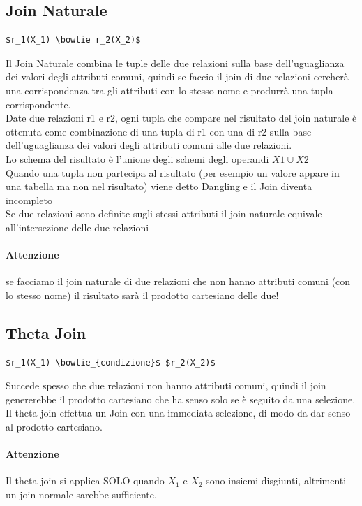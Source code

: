 \documentclass[12pt, a4paper, openany]{book}
\begin{document}
\subsection{Join Naturale}
\begin{lstlisting}[mathescape=true]
$r_1(X_1) \bowtie r_2(X_2)$
\end{lstlisting}
Il Join Naturale combina le tuple delle due relazioni sulla base dell'uguaglianza dei valori degli attributi comuni, quindi se faccio il join di due relazioni cercherà una corrispondenza tra gli attributi con lo stesso nome e produrrà una tupla corrispondente.
\\Date due relazioni r1 e r2, ogni tupla che compare nel risultato del join naturale è ottenuta come combinazione di una tupla di r1 con una di r2 sulla base dell'uguaglianza dei valori degli attributi comuni alle due relazioni.\\
Lo schema del risultato è l'unione degli schemi degli operandi $X1 \cup X2$
\\Quando una tupla non partecipa al risultato (per esempio un valore appare in una tabella ma non nel risultato) viene detto Dangling e il Join diventa incompleto
\\Se due relazioni sono definite sugli stessi attributi il join naturale equivale all'intersezione delle due relazioni
\paragraph{Attenzione} se facciamo il join naturale di due relazioni che non hanno attributi comuni (con lo stesso nome) il risultato sarà il prodotto cartesiano delle due! 

\subsection{Theta Join}
\begin{lstlisting}[mathescape=true]
$r_1(X_1) \bowtie_{condizione}$ $r_2(X_2)$
\end{lstlisting}
Succede spesso che due relazioni non hanno attributi comuni, quindi il join genererebbe il prodotto cartesiano che ha senso solo se è seguito da una selezione.
\\Il theta join effettua un Join con una immediata selezione, di modo da dar senso al prodotto cartesiano.
\paragraph{Attenzione} Il theta join si applica SOLO quando $X_1$ e $X_2$ sono insiemi disgiunti, altrimenti un join normale sarebbe sufficiente.
\end{document}
